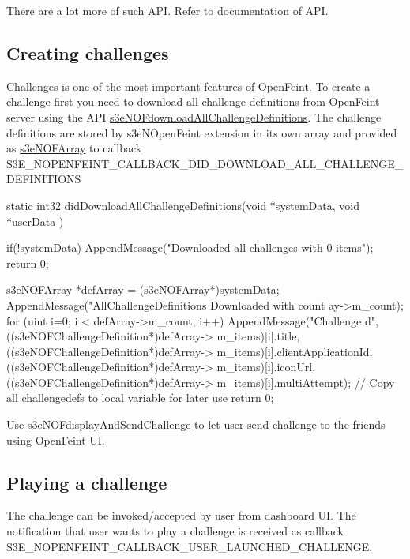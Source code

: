 There are a lot more of such API. Refer to documentation of API.\hypertarget{index_sec_4_4}{}\subsection{Creating challenges}\label{index_sec_4_4}
Challenges is one of the most important features of OpenFeint. To create a challenge first you need to download all challenge definitions from OpenFeint server using the API \hyperlink{group___n_open_feint_api_group_ga3b6050107c6b8a85bbc40a99efdc0bbb}{s3eNOFdownloadAllChallengeDefinitions}. The challenge definitions are stored by s3eNOpenFeint extension in its own array and provided as \hyperlink{structs3e_n_o_f_array}{s3eNOFArray} to callback S3E\_\-NOPENFEINT\_\-CALLBACK\_\-DID\_\-DOWNLOAD\_\-ALL\_\-CHALLENGE\_\-DEFINITIONS


\begin{DoxyCode}
 static int32 didDownloadAllChallengeDefinitions(void *systemData, void *userData
      )
 {
        if(!systemData)
        {
                AppendMessage("Downloaded all challenges with 0 items");
                return 0;
        }
                
        s3eNOFArray *defArray = (s3eNOFArray*)systemData;
        AppendMessage("AllChallengeDefinitions Downloaded with count %
      ay->m_count);
        for (uint i=0; i < defArray->m_count; i++) {
                AppendMessage("Challenge %
      d",
                                          ((s3eNOFChallengeDefinition*)defArray->
      m_items)[i].title,
                                          ((s3eNOFChallengeDefinition*)defArray->
      m_items)[i].clientApplicationId,
                                          ((s3eNOFChallengeDefinition*)defArray->
      m_items)[i].iconUrl,
                                          ((s3eNOFChallengeDefinition*)defArray->
      m_items)[i].multiAttempt);
        }
        // Copy all challengedefs to local variable for later use
        return 0;
 }
\end{DoxyCode}


Use \hyperlink{group___n_open_feint_api_group_ga396467328a4a70b44493263ceffec609}{s3eNOFdisplayAndSendChallenge} to let user send challenge to the friends using OpenFeint UI.\hypertarget{index_sec_4_5}{}\subsection{Playing a challenge}\label{index_sec_4_5}
The challenge can be invoked/accepted by user from dashboard UI. The notification that user wants to play a challenge is received as callback S3E\_\-NOPENFEINT\_\-CALLBACK\_\-USER\_\-LAUNCHED\_\-CHALLENGE.


